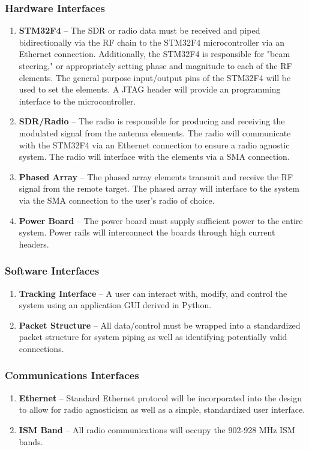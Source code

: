 \documentclass[ProjectRequirements.tex]{subfiles}
\begin{document}
		\subsubsection{Hardware Interfaces}
			\begin{enumerate}\itemsep1pt
				\item \textbf{STM32F4} -- The SDR or radio data must be received and piped bidirectionally via the RF chain to the STM32F4 microcontroller via an Ethernet connection.  Additionally, the STM32F4 is responsible for "beam steering," or appropriately setting phase and magnitude to each of the RF elements.  The general purpose input/output pins of the STM32F4 will be used to set the elements. A JTAG header will provide an programming interface to the microcontroller.
				\item \textbf{SDR/Radio} -- The radio is responsible for producing and receiving the modulated signal from the antenna elements.  The radio will communicate with the STM32F4 via an Ethernet connection to ensure a radio agnostic system.  The radio will interface with the elements via a SMA connection.  
				\item \textbf{Phased Array} -- The phased array elements transmit and receive the RF signal from the remote target.  The phased array will interface to the system via the SMA connection to the user's radio of choice.
				\item \textbf{Power Board} -- The power board must supply sufficient power to the entire system.  Power rails will interconnect the boards through high current headers.
			\end{enumerate}
			
		\subsubsection{Software Interfaces}
			\begin{enumerate}\itemsep1pt
				\item \textbf{Tracking Interface} -- A user can interact with, modify, and control the system using an application GUI derived in Python.
				\item \textbf{Packet Structure} -- All data/control must be wrapped into a standardized packet structure for system piping as well as identifying potentially valid connections.
			\end{enumerate}
			
		\subsubsection{Communications Interfaces}
			\begin{enumerate}\itemsep1pt
				\item \textbf{Ethernet} -- Standard Ethernet protocol will be incorporated into the design to allow for radio agnosticism as well as a simple, standardized user interface.
				\item \textbf{ISM Band} -- All radio communications will occupy the 902-928 MHz ISM bands.
			\end{enumerate}
			
\end{document}
